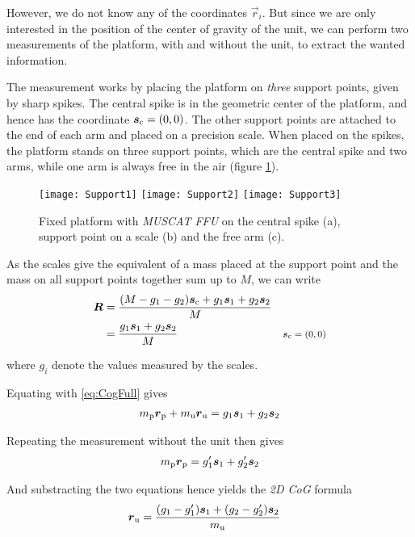 \documentclass[journal]{IEEEtran}
\begin{document}
However, we do not know any of the coordinates $\vec{r}_i$. 
But since we are only interested in the position of the center of gravity of the unit, we can perform two measurements of the platform, with and without the unit, to extract the wanted information.

The measurement works by placing the platform on \emph{three} support points, given by sharp spikes.
The central spike is in the geometric center of the platform, and hence has the coordinate $\vec{s}_{\textup{c}} = (0, 0)$.
The other support points are attached to the end of each arm and placed on a precision scale. When placed on the spikes, the platform stands on three support points, which are the central spike and two arms, while one arm is always free in the air (figure \ref{fig:Support}).

\begin{figure}[b]
	\centering
	\texttt{[image: Support1]}
	\texttt{[image: Support2]}
	\texttt{[image: Support3]}
	\caption{Fixed platform with \emph{MUSCAT FFU} on the central spike (a), support point on a scale (b) and the free arm (c).}
	\label{fig:Support}
\end{figure}

As the scales give the equivalent of a mass placed at the support point and the mass on all support points together sum up to $M$, we can write
\begin{align}
	\vec{R} & = \frac{(M - g_1 - g_2) \vec{s}_{\textup{c}} + g_1 \vec{s}_1 + g_2 \vec{s}_2}{M} \\
	& = \frac{g_1 \vec{s}_1 + g_2 \vec{s}_2}{M} & \comment{$\vec{s}_{\textup{c}} = (0,0)$}
\end{align}

where $g_i$ denote the values measured by the scales.

Equating with \eqref{eq:CogFull} gives
\begin{align}
	m_{\textup{p}} \vec{r}_{\textup{p}} + m_{\textup{u}} \vec{r}_{\textup{u}} = g_1 \vec{s}_1 + g_2 \vec{s}_2
\end{align}

Repeating the measurement without the unit then gives
\begin{align}
	m_{\textup{p}} \vec{r}_{\textup{p}} = g_1' \vec{s}_1 + g_2' \vec{s}_2
\end{align}

And substracting the two equations hence yields the \emph{2D CoG} formula
\begin{align}
	\vec{r}_{\textup{u}} & =  \frac{(g_1 - g_1') \vec{s}_1 + (g_2 - g_2') \vec{s}_2}{m_{\textup{u}}}
	\label{eq:2DCoG}
\end{align}
\end{document}
